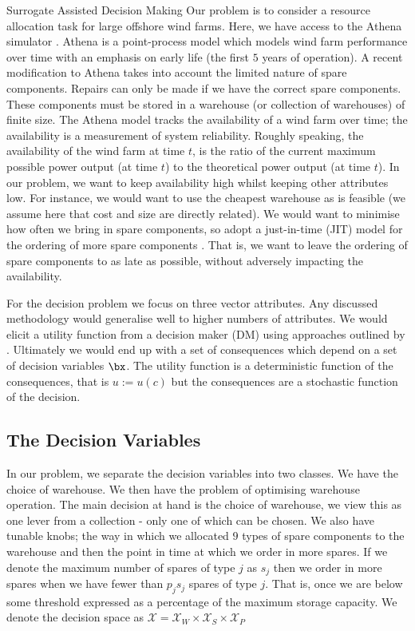 \begin{chapter}{Surrogate Assisted Decision Making \label{Chap:optimisation}}
Our problem is to consider a resource allocation task for large offshore wind farms. Here, we have access to the Athena simulator \citep{Zit13, Zit16}. Athena is a point-process model which models wind farm performance over time with an emphasis on early life (the first  $5$ years of operation). A recent modification to Athena takes into account the limited nature of spare components. Repairs can only be made if we have the correct spare components. These components must be stored in a warehouse (or collection of warehouses) of finite size. The Athena model tracks the availability of a wind farm over time; the availability is a measurement of system reliability. Roughly speaking, the availability of the wind farm at time $t$, is the ratio of the current maximum possible power output (at time $t$) to the theoretical power output (at time $t$). In our problem, we want to keep availability high whilst keeping other attributes low. For instance, we would want to use the cheapest warehouse as is feasible (we assume here that cost and size are directly related). We would want to minimise how often we bring in spare components, so adopt a just-in-time (JIT) model for the ordering of more spare components \citep{Bertelsen1997}. That is, we want to leave the ordering of spare components to as late as possible, without adversely impacting the availability.

For the decision problem we focus on three vector attributes. Any discussed methodology would generalise well to higher numbers of attributes. We would elicit a utility function from a decision maker (DM) using approaches outlined by \citet{Smith2010}. Ultimately we would end up with a set of consequences which depend on a set of decision variables $\bx$. The utility function is a deterministic function of the consequences, that is $u := u(c)$ but the consequences are a stochastic function of the decision.

\subsection{The Decision Variables}

In our problem, we separate the decision variables into two classes. We have the choice of warehouse. We then have the problem of optimising warehouse operation. The main decision at hand is the choice of warehouse, we view this as one lever from a collection - only one of which can be chosen. We also have tunable knobs; the way in which we allocated $9$ types of spare components to the warehouse and then the point in time at which we order in more spares. If we denote the maximum number of spares of type $j$ as $s_j$ then we order in more spares when we have fewer than $p_j s_j$ spares of type $j$. That is, once we are below some threshold expressed as a percentage of the maximum storage capacity. We denote the decision space as $\mathcal{X} = \mathcal{X}_W \times \mathcal{X}_S \times \mathcal{X}_P$


\end{chapter}
